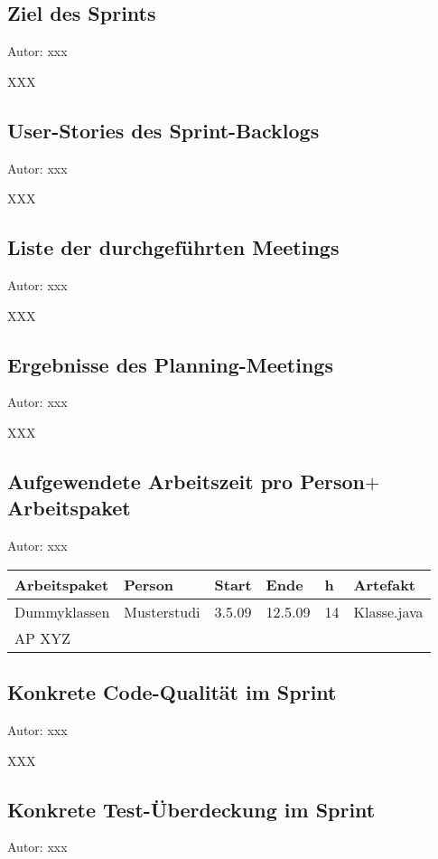 
\subsection{Ziel des Sprints}
{\small Autor: xxx}

XXX

\subsection{User-Stories des Sprint-Backlogs}
{\small Autor: xxx}

XXX

\subsection{Liste der durchgeführten Meetings}
{\small Autor: xxx}

XXX

\subsection{Ergebnisse des Planning-Meetings}
{\small Autor: xxx}

XXX

\subsection{Aufgewendete Arbeitszeit pro Person$+$Arbeitspaket}
{\small Autor: xxx}

\begin{longtable}{|p{4cm}|l|l|l|l|l|}
        \hline
        Arbeitspaket & Person & Start & Ende & h & Artefakt\\
        \hline
        Dummyklassen & Musterstudi & 3.5.09 & 12.5.09 & 14 & Klasse.java\\ \hline
        AP XYZ &  &  &  & & \\ \hline
      \end{longtable}

\subsection{Konkrete Code-Qualität im Sprint}
{\small Autor: xxx}

XXX

\subsection{Konkrete Test-Überdeckung im Sprint}
{\small Autor: xxx}

